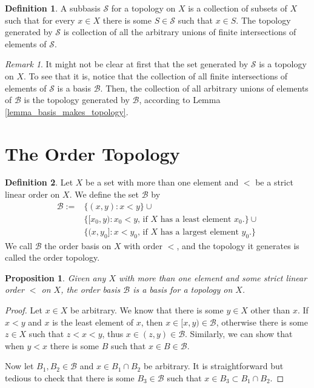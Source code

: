 \documentclass{report}
\newtheorem{proposition}{Proposition}[section]
\theoremstyle{definition}
\newtheorem{definition}{Definition}[section]
\theoremstyle{remark}
\newtheorem{remark}{Remark}[section]
\newcommand{\set}[1]{\{#1\}}
\newcommand{\prt}[1]{\mathcal{#1}}
\begin{document}
\begin{definition}\label{def_subbasis}
    A subbasis $\prt{S}$ for a topology on $X$ is a collection of subsets of $X$ such that for every $x \in X$ there is some $S \in \prt{S}$ such that $x \in S$. The topology generated by $\prt{S}$ is collection of all the arbitrary unions of finite intersections of elements of $\prt{S}$.
\end{definition}

\begin{remark}
     It might not be clear at first that the set generated by $\prt{S}$ is a topology on $X$. To see that it is, notice that the collection of all finite intersections of elements of $\prt{S}$ is a basis $\prt{B}$. Then, the collection of all arbitrary unions of elements of $\prt{B}$ is the topology generated by $\prt{B}$, according to Lemma \ref{lemma_basis_makes_topology}.
\end{remark}

\section{The Order Topology}

\begin{definition}\label{def_order_basis}
    Let $X$ be a set with more than one element and $<$ be a strict linear order on $X$. We define the set $\prt{B}$ by 
    \begin{align*}
        \prt{B} := &\set{(x, y) : x < y} \cup \\ &\set{[x_0, y) : x_0 < y\text{, if $X$ has a least element $x_0$.}} \cup \\ 
        &\set{(x, y_0] : x < y_0\text{, if $X$ has a largest element $y_0$.}}
    \end{align*}
    We call $\prt{B}$ the order basis on $X$ with order $<$, and the topology it generates is called the order topology.
\end{definition}

\begin{proposition}
    Given any $X$ with more than one element and some strict linear order $<$ on $X$, the order basis $\prt{B}$ is a basis for a topology on $X$.
\end{proposition}

\begin{proof}
    Let $x \in X$ be arbitrary. We know that there is some $y \in X$ other than $x$. If $x < y$ and $x$ is the least element of $x$, then $x \in [x, y) \in \prt{B}$, otherwise there is some $z \in X$ such that $z < x < y$, thus $x \in (z, y) \in \prt{B}$. Similarly, we can show that when $y < x$ there is some $B$ such that $x \in B \in \prt{B}$.
    
    Now let $B_1, B_2 \in \prt{B}$ and $x \in B_1 \cap B_2$ be arbitrary. It is straightforward but tedious to check that there is some $B_3 \in \prt{B}$ such that $x \in B_3 \subset B_1 \cap B_2$.
\end{proof}
\end{document}
